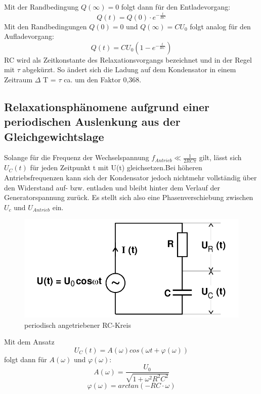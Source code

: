 Mit der Randbedingung $ Q(\infty)=0$ folgt dann für den Entladevorgang:
\begin{equation}
  Q(t) = Q(0) \cdot e^{-\frac{t}{RC}}
\end{equation}
Mit den Randbedingungen $Q(0) = 0 $ und $Q(\infty) = CU_0$ folgt analog für
den Aufladevorgang:
\begin{equation}
  Q(t) = CU_0 \left(1-e^{-\frac{t}{RC}}\right)
\end{equation}
RC wird als Zeitkonstante des Relaxationsvorgangs bezeichnet und in der Regel mit
 $\tau$ abgekürzt. So ändert sich die Ladung auf dem Kondensator in einem Zeitraum
 $\Delta$ T = $\tau$ ca. um den Faktor 0,368.

 \subsection{Relaxationsphänomene aufgrund einer periodischen Auslenkung aus der Gleichgewichtslage}

 Solange für die Frequenz der Wechselspannung $ f_{Antrieb} \ll \frac{1}{2RC\pi} $ gilt, lässt sich
 $U_C(t)$ für jeden Zeitpunkt t mit U(t) gleichsetzen.Bei höheren Antriebsfrequenzen
 kann sich der Kondensator jedoch nichtmehr vollständig über den Widerstand
  auf- bzw. entladen und bleibt hinter dem Verlauf der Generatorspannung zurück.
  Es stellt sich also eine Phasenverschiebung zwischen $U_c$ und $U_{Antrieb}$ ein.

\begin{figure}[H]
  \centering

  \includegraphics[width=\linewidth-200pt,height=\textheight-200pt,keepaspectratio]{content/RC_Kreis2.png}
  \caption{periodisch angetriebener RC-Kreis}
  \label{fig:RC_Kreis2}
\end{figure}

  Mit dem Ansatz
  \begin{equation}
  U_C(t) = A(\omega)cos(\omega t+\varphi(\omega))
  \end{equation}
  folgt dann für $A(\omega)$ und $\varphi(\omega)$:
  \begin{equation}
    A(\omega) = \frac{U_0}{\sqrt{1+\omega^2R^2C^2}}
  \end{equation}
  \begin{equation}
    \varphi(\omega) = arctan(-RC \cdot \omega)
  \end{equation}


